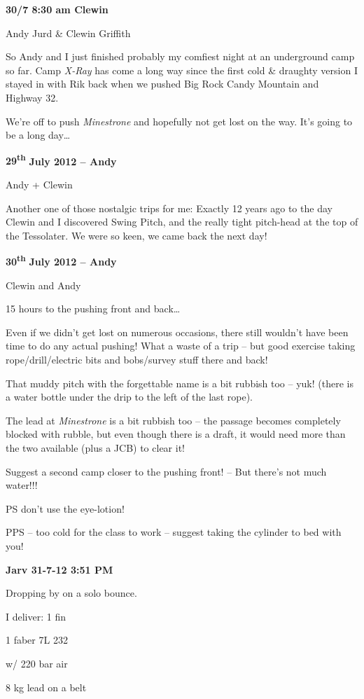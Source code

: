 \textbf{30/7 8:30 am Clewin}

Andy Jurd \& Clewin Griffith

So Andy and I just finished probably my comfiest night at an underground
camp so far. Camp \emph{X-Ray} has come a long way since the first cold
\& draughty version I stayed in with Rik back when we pushed Big Rock
Candy Mountain and Highway 32.

We're off to push \emph{Minestrone} and hopefully not get lost on the
way. It's going to be a long day\ldots{}

\textbf{29\textsuperscript{th}} \textbf{July 2012 -- Andy}

Andy + Clewin

Another one of those nostalgic trips for me: Exactly 12 years ago to the
day Clewin and I discovered Swing Pitch, and the really tight pitch-head
at the top of the Tessolater. We were so keen, we came back the next
day!

\textbf{30\textsuperscript{th}} \textbf{July 2012 -- Andy}

Clewin and Andy

15 hours to the pushing front and back\ldots{}

Even if we didn't get lost on numerous occasions, there still wouldn't
have been time to do any actual pushing! What a waste of a trip -- but
good exercise taking rope/drill/electric bits and bobs/survey stuff
there and back!

That muddy pitch with the forgettable name is a bit rubbish too -- yuk!
(there is a water bottle under the drip to the left of the last rope).

The lead at \emph{Minestrone} is a bit rubbish too -- the passage
becomes completely blocked with rubble, but even though there is a
draft, it would need more than the two available (plus a JCB) to clear
it!

Suggest a second camp closer to the pushing front! -- But there's not
much water!!!

PS don't use the eye-lotion!

PPS -- too cold for the class to work -- suggest taking the cylinder to
bed with you!

\textbf{Jarv 31-7-12 3:51 PM}

Dropping by on a solo bounce.

I deliver: 1 fin

1 faber 7L 232

w/ 220 bar air

8 kg lead on a belt

